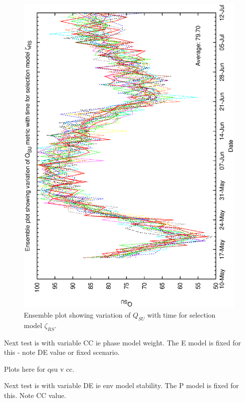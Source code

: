 \begin{figure}[h]
 \label{fig:ensemble_relscorebias}
\begin{center}
 \includegraphics[scale=0.5, angle=-90]{figures/biasrs_ensemble.eps}
 \caption[Ensemble plot showing variation of $Q_{SU}$ with time for selection model $\zeta_{RS}$.] 
   {Ensemble plot showing variation of $Q_{SU}$ with time for selection model $\zeta_{RS}$.}
\end{center}
\end{figure}



Next test is with variable CC ie phase model weight. The E model is fixed for this - note DE value or fixed scenario.

Plots here for qsu v cc.


Next test is with variable DE ie env model stability. The P model is fixed for this. Note CC value. 


